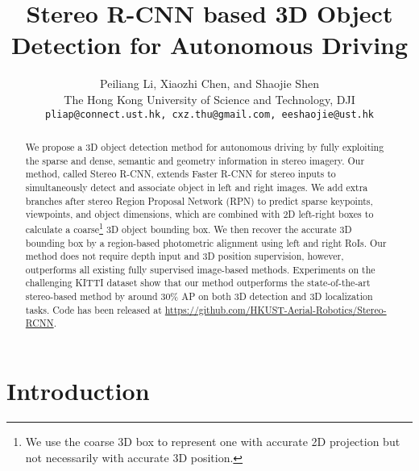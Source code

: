\documentclass[10pt,twocolumn,letterpaper]{article}
\begin{document}
\title{Stereo R-CNN based 3D Object Detection for Autonomous Driving}

\author{Peiliang Li, Xiaozhi Chen, and Shaojie Shen\\
The Hong Kong University of Science and Technology, DJI\\
{\tt\small pliap@connect.ust.hk, cxz.thu@gmail.com, eeshaojie@ust.hk}
}

\maketitle


\begin{abstract}
		We propose a 3D object detection method for autonomous driving by fully exploiting the sparse and dense, semantic and geometry information in stereo imagery. Our method, called Stereo R-CNN, extends Faster R-CNN for stereo inputs to simultaneously detect and associate object in left and right images. We add extra branches after stereo Region Proposal Network (RPN) to predict sparse keypoints, viewpoints, and object dimensions, which are combined with 2D left-right boxes to calculate a coarse\footnote{We use the coarse 3D box to represent one with accurate 2D projection but not necessarily with accurate 3D position.} 3D object bounding box. We then recover the accurate 3D bounding box by a region-based photometric alignment using left and right RoIs. Our method does not require depth input and 3D position supervision, however, outperforms all existing fully supervised image-based methods. Experiments on the challenging KITTI dataset show that our method outperforms the state-of-the-art stereo-based method by around 30\% AP on both 3D detection and 3D localization tasks.
Code has been released at \href{https://github.com/HKUST-Aerial-Robotics/Stereo-RCNN}{https://github.com/HKUST-Aerial-Robotics/Stereo-RCNN}.
	\end{abstract}
	
\section{Introduction}
	
\end{document}
